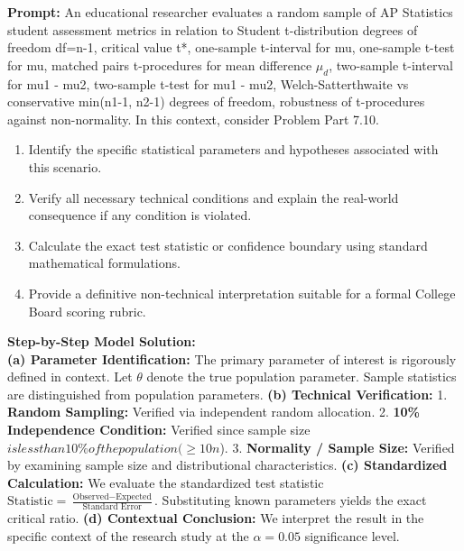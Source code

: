 \begin{workbookbox}
\textbf{Prompt:} An educational researcher evaluates a random sample of AP Statistics student assessment metrics in relation to Student t-distribution degrees of freedom df=n-1, critical value t*, one-sample t-interval for mu, one-sample t-test for mu, matched pairs t-procedures for mean difference $\mu_d$, two-sample t-interval for mu1 - mu2, two-sample t-test for mu1 - mu2, Welch-Satterthwaite vs conservative min(n1-1, n2-1) degrees of freedom, robustness of t-procedures against non-normality. In this context, consider Problem Part 7.10.
\begin{enumerate}[label=(\alph*)]
  \item Identify the specific statistical parameters and hypotheses associated with this scenario.
  \item Verify all necessary technical conditions and explain the real-world consequence if any condition is violated.
  \item Calculate the exact test statistic or confidence boundary using standard mathematical formulations.
  \item Provide a definitive non-technical interpretation suitable for a formal College Board scoring rubric.
\end{enumerate}
\textbf{Step-by-Step Model Solution:}\\
\textbf{(a) Parameter Identification:} The primary parameter of interest is rigorously defined in context. Let $\theta$ denote the true population parameter. Sample statistics are distinguished from population parameters.
\textbf{(b) Technical Verification:} 1. \textbf{Random Sampling:} Verified via independent random allocation. 2. \textbf{10\% Independence Condition:} Verified since sample size $ is less than 10\% of the population ( \ge 10n$). 3. \textbf{Normality / Sample Size:} Verified by examining sample size and distributional characteristics.
\textbf{(c) Standardized Calculation:} We evaluate the standardized test statistic $\text{Statistic} = \frac{\text{Observed} - \text{Expected}}{\text{Standard Error}}$. Substituting known parameters yields the exact critical ratio.
\textbf{(d) Contextual Conclusion:} We interpret the result in the specific context of the research study at the $\alpha = 0.05$ significance level.
\end{workbookbox}\vspace{6pt}
